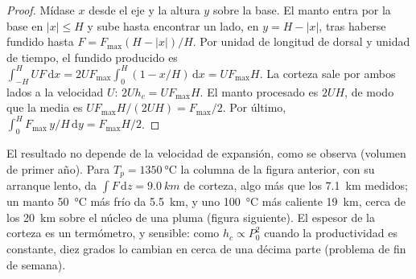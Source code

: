 \begin{proof}
Mídase $x$ desde el eje y la altura $y$ sobre la base. El manto entra por la base
en $|x| \le H$ y sube hasta encontrar un lado, en $y = H - |x|$, tras haberse fundido hasta
$F = F_{\max}(H - |x|)/H$. Por unidad de longitud de dorsal y unidad de tiempo, el fundido producido es
$\int_{-H}^{H} U F\,\mathrm dx = 2UF_{\max}\int_0^H (1 - x/H)\,\mathrm dx =
UF_{\max}H$. La corteza sale por ambos lados a la velocidad $U$: $2Uh_c = UF_{\max}H$.
El manto procesado es $2UH$, de modo que la  media es $UF_{\max}H/(2UH) =
F_{\max}/2$. Por último, $\int_0^H F_{\max}\,y/H\,\mathrm dy = F_{\max}H/2$.
\end{proof}

El resultado no depende de la velocidad de expansión, como se observa (volumen de primer
año). Para $T_p = \qty{1350}{\celsius}$ la columna de la figura anterior, con su
arranque lento, da $\int F\,\mathrm dz = \qty{9.0}{km}$ de corteza, algo más
que los \qty{7.1}{km} medidos; un manto \qty{50}{\celsius} más frío da
\qty{5.5}{km}, y uno \qty{100}{\celsius} más caliente \qty{19}{km}, cerca de los
\qty{20}{km} sobre el núcleo de una pluma (figura siguiente). El espesor de la corteza es un
termómetro, y sensible: como $h_c \propto P_0^2$ cuando la productividad es
constante, diez grados lo cambian en cerca de una décima parte (problema de fin de semana).

